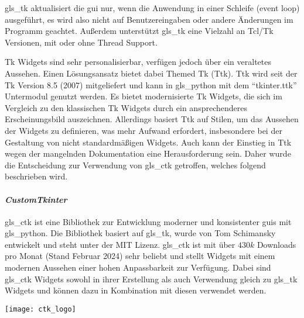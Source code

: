\gls{gls_tk} aktualisiert die \acs{gui} nur, wenn die Anwendung in einer Schleife (event loop) ausgeführt, es wird also nicht auf Benutzereingaben oder andere Änderungen im Programm geachtet. Außerdem unterstützt \gls{gls_tk} eine Vielzahl an Tcl/Tk Versionen, mit oder ohne Thread Support. \cite[vgl.][]{Python_Software_Foundation_Tk:o.J.}

Tk Widgets sind sehr personalisierbar, verfügen jedoch über ein veraltetes Aussehen. Einen Lösungsansatz bietet dabei Themed Tk (Ttk). Ttk wird seit der Tk Version 8.5 (2007) mitgeliefert und kann in \gls{gls_python} mit dem \enquote{tkinter.ttk} Untermodul genutzt werden. Es bietet modernisierte Tk Widgets, die sich im Vergleich zu den klassischen Tk Widgets durch ein ansprechenderes Erscheinungsbild auszeichnen. Allerdings basiert Ttk  auf Stilen, um das Aussehen der Widgets zu definieren, was mehr Aufwand erfordert, insbesondere bei der Gestaltung von nicht standardmäßigen Widgets. Auch kann der Einstieg in Ttk wegen der mangelnden Dokumentation eine Herausforderung sein. Daher wurde die Entscheidung zur Verwendung von \gls{gls_ctk} getroffen, welches folgend beschrieben wird. \cite[vgl.][]{Python_Software_Foundation_Tk:o.J., stackoverflow_tk_ttk:2013}


\paragraph{\textit{CustomTkinter}}\label{ctk_kapitel}
\begin{minipage}{0.6\textwidth}
	\gls{gls_ctk} ist eine Bibliothek zur Entwicklung moderner und konsistenter \acsp{gui} mit \gls{gls_python}. Die Bibliothek basiert auf \gls{gls_tk}, wurde von Tom Schimansky entwickelt und steht unter der MIT Lizenz. \gls{gls_ctk} ist mit über $430k$ Downloads pro Monat (Stand Februar 2024) sehr beliebt und stellt Widgets mit einem modernen Aussehen einer hohen Anpassbarkeit zur Verfügung. Dabei sind \gls{gls_ctk} Widgets sowohl in ihrer Erstellung als auch Verwendung gleich zu \gls{gls_tk} Widgets und können dazu in Kombination mit diesen verwendet werden. \cite[vgl.][]{Schimansky_Git:o.J.}
\end{minipage}%
\hfill
\begin{minipage}{0.37\textwidth}
	\centering	
	\texttt{[image: ctk\_logo]}
\end{minipage}
\vspace{1ex}


